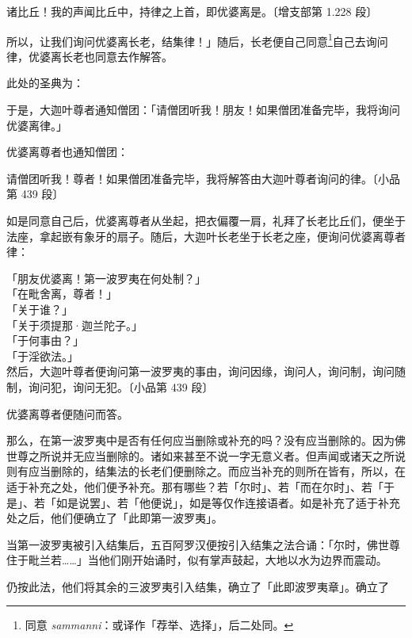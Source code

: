 \begin{quoting}诸比丘！我的声闻比丘中，持律之上首，即优婆离是。{\bluefootnotesize 〔增支部第 1.228 段〕}\end{quoting}

所以，让我们询问优婆离长老，结集律！」随后，长老便自己同意\footnote{同意 \textit{sammanni}：或译作「荐举、选择」，后二处同。}自己去询问律，优婆离长老也同意去作解答。

此处的圣典为：

\begin{quoting}于是，大迦叶尊者通知僧团：「请僧团听我！朋友！如果僧团准备完毕，我将询问优婆离律。」\end{quoting}

优婆离尊者也通知僧团：

\begin{quoting}请僧团听我！尊者！如果僧团准备完毕，我将解答由大迦叶尊者询问的律。{\bluefootnotesize 〔小品第 439 段〕}\end{quoting}

如是同意自己后，优婆离尊者从坐起，把衣偏覆一肩，礼拜了长老比丘们，便坐于法座，拿起嵌有象牙的扇子。随后，大迦叶长老坐于长老之座，便询问优婆离尊者律：

\begin{quoting}「朋友优婆离！第一波罗夷在何处制？」\\「在毗舍离，尊者！」\\「关于谁？」\\「关于须提那·迦兰陀子。」\\「于何事由？」\\「于淫欲法。」\\然后，大迦叶尊者便询问第一波罗夷的事由，询问因缘，询问人，询问制，询问随制，询问犯，询问无犯。{\bluefootnotesize 〔小品第 439 段〕}\end{quoting}

优婆离尊者便随问而答。

那么，在第一波罗夷中是否有任何应当删除或补充的吗？没有应当删除的。因为佛世尊之所说并无应当删除的。诸如来甚至不说一字无意义者。但声闻或诸天之所说则有应当删除的，结集法的长老们便删除之。而应当补充的则所在皆有，所以，在适于补充之处，他们便予补充。那有哪些？若「尔时」、若「而在尔时」、若「于是」、若「如是说罢」、若「他便说」，如是等仅作连接语者。如是补充了适于补充处之后，他们便确立了「此即第一波罗夷」。

当第一波罗夷被引入结集后，五百阿罗汉便按引入结集之法合诵：「尔时，佛世尊住于毗兰若……」当他们刚开始诵时，似有掌声鼓起，大地以水为边界而震动。

仍按此法，他们将其余的三波罗夷引入结集，确立了「此即波罗夷章」。确立了

